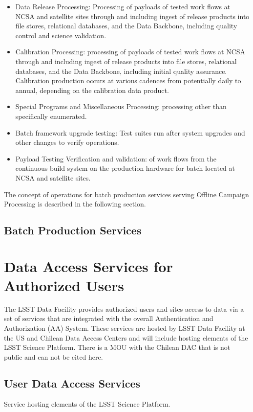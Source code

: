 \begin{itemize}
\item  Data Release Processing: Processing of payloads of tested work flows at
NCSA and satellite sites through and including ingest of release products into
file stores, relational databases, and the Data Backbone, including quality control and science validation. 

\item  Calibration Processing: processing of payloads of tested work flows at NCSA
through and including ingest of release products into file
stores, relational databases, and the Data Backbone, including initial quality
assurance. Calibration production occurs at various cadences from potentially
daily to annual, depending on the calibration data product.
\item  Special Programs and Miscellaneous Processing: processing other than
specifically enumerated.
\item  Batch framework upgrade testing: Test suites run after system upgrades
and other changes to verify operations.
\item  Payload Testing Verification and validation: of work flows from the
continuous build system on the production hardware for batch located at NCSA and satellite
sites.
\end{itemize}

The concept of operations for batch production services serving Offline Campaign
Processing is described in the following section.

\subsection{Batch Production Services}


\section{Data Access Services for Authorized Users}
The LSST Data Facility provides authorized users and sites access to data via a
set of services that are integrated with the overall Authentication and
Authorization (AA) System. These services are hosted by LSST Data Facility at
the US and Chilean Data Access Centers and will include hosting elements of the
LSST Science Platform. There is a MOU with the Chilean DAC that is not public and can not be cited here.

\subsection{User Data Access Services}
Service hosting elements of the LSST Science Platform.


